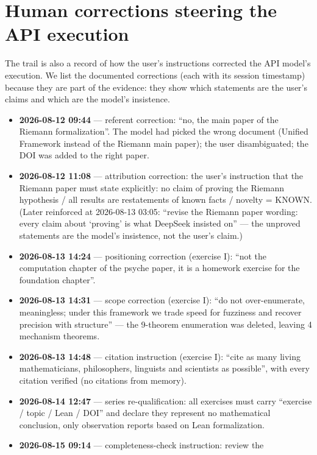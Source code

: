 \documentclass[sigplan,10pt,anonymous,review]{acmart}
\begin{document}
\section{Human corrections steering the API execution}

The trail is also a record of how the user's instructions corrected the API
model's execution. We list the documented corrections (each with its session
timestamp) because they are part of the evidence: they show which statements
are the user's claims and which are the model's insistence.

\begin{itemize}
\item \textbf{2026-08-12 09:44} --- referent correction: ``no, the main paper
of the Riemann formalization''. The model had picked the wrong document
(Unified Framework instead of the Riemann main paper); the user
disambiguated; the DOI was added to the right paper.
\item \textbf{2026-08-12 11:08} --- attribution correction: the user's
instruction that the Riemann paper must state explicitly: no claim of
proving the Riemann hypothesis / all results are restatements of known facts
/ novelty = KNOWN. (Later reinforced at 2026-08-13 03:05: ``revise the
Riemann paper wording: every claim about `proving' is what DeepSeek insisted
on'' --- the unproved statements are the model's insistence, not the user's
claim.)
\item \textbf{2026-08-13 14:24} --- positioning correction (exercise I): ``not
the computation chapter of the psyche paper, it is a homework exercise for
the foundation chapter''.
\item \textbf{2026-08-13 14:31} --- scope correction (exercise I): ``do not
over-enumerate, meaningless; under this framework we trade speed for
fuzziness and recover precision with structure'' --- the 9-theorem
enumeration was deleted, leaving 4 mechanism theorems.
\item \textbf{2026-08-13 14:48} --- citation instruction (exercise I): ``cite
as many living mathematicians, philosophers, linguists and scientists as
possible'', with every citation verified (no citations from memory).
\item \textbf{2026-08-14 12:47} --- series re-qualification: all exercises
must carry ``exercise / topic / Lean / DOI'' and declare they represent no
mathematical conclusion, only observation reports based on Lean
formalization.
\item \textbf{2026-08-15 09:14} --- completeness-check instruction: review the

\end{itemize}
\end{document}
